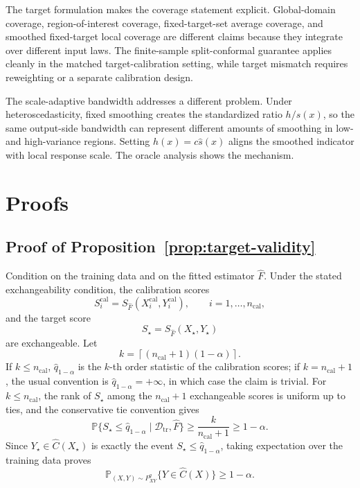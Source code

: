 \documentclass[11pt]{article}
\newcommand{\Dcal}{\mathcal D}
\newcommand{\Pp}{\mathbb P}
\newif\ifincludeexperiments
\begin{document}
The target formulation makes the coverage statement explicit. Global-domain coverage, region-of-interest coverage, fixed-target-set average coverage, and smoothed fixed-target local coverage are different claims because they integrate over different input laws. The finite-sample split-conformal guarantee applies cleanly in the matched target-calibration setting, while target mismatch requires reweighting or a separate calibration design.

The scale-adaptive bandwidth addresses a different problem. Under heteroscedasticity, fixed smoothing creates the standardized ratio \(h/s(x)\), so the same output-side bandwidth can represent different amounts of smoothing in low- and high-variance regions. Setting \(h(x)=c\widehat s(x)\) aligns the smoothed indicator with local response scale. The oracle analysis shows the mechanism.

\ifincludeexperiments
The present experiments focus on calibrated interval performance rather than raw CDF estimation alone. Raw CDF diagnostics are useful for mechanism checks, but the inferential targets are coverage, width, interval score, and groupwise stability after conformal calibration. The current numerical evidence supports the scale-adaptive smoothing claim under matched global target distributions. Region-of-interest targets and external conformal or simulation-UQ baselines are natural extensions, but they are not needed for the finite-sample validity statement or for isolating the bandwidth mechanism studied here.
\fi

\appendix

\section{Proofs}
\label{app:proofs}

\subsection{Proof of Proposition~\ref{prop:target-validity}}

Condition on the training data and on the fitted estimator \(\widehat F\). Under the stated exchangeability condition, the calibration scores
\[
  S_i^{\mathrm{cal}}=S_{\widehat F}(X_i^{\mathrm{cal}},Y_i^{\mathrm{cal}}),
  \qquad i=1,\ldots,n_{\mathrm{cal}},
\]
and the target score
\[
  S_\star=S_{\widehat F}(X_\star,Y_\star)
\]
are exchangeable. Let
\[
  k=\left\lceil (n_{\mathrm{cal}}+1)(1-\alpha)\right\rceil .
\]
If \(k\le n_{\mathrm{cal}}\), \(\widehat q_{1-\alpha}\) is the \(k\)-th order statistic of the calibration scores; if \(k=n_{\mathrm{cal}}+1\), the usual convention is \(\widehat q_{1-\alpha}=+\infty\), in which case the claim is trivial. For \(k\le n_{\mathrm{cal}}\), the rank of \(S_\star\) among the \(n_{\mathrm{cal}}+1\) exchangeable scores is uniform up to ties, and the conservative tie convention gives
\[
  \Pp\{S_\star\le \widehat q_{1-\alpha}\mid \Dcal_{\mathrm{tr}},\widehat F\}
  \ge
  \frac{k}{n_{\mathrm{cal}}+1}
  \ge
  1-\alpha .
\]
Since \(Y_\star\in\widehat C(X_\star)\) is exactly the event \(S_\star\le\widehat q_{1-\alpha}\), taking expectation over the training data proves
\[
  \Pp_{(X,Y)\sim P^q_{XY}}\{Y\in\widehat C(X)\}\ge 1-\alpha .
\]
\end{document}
